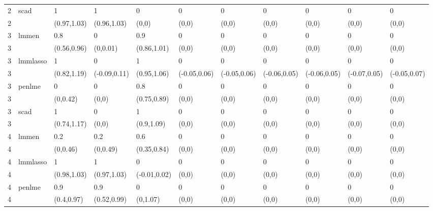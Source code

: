\documentclass[varwidth, border={10 5 10 5}]{standalone}
\begin{document}
\begin{table}[ht]
\begin{tabular}{lllllllllll}
  2 & \multirow{2}{*}{scad} & 1 & 1 & 0 & 0 & 0 & 0 & 0 & 0 & 0 \\ 
  2 &  & (0.97,1.03) & (0.96,1.03) & (0,0) & (0,0) & (0,0) & (0,0) & (0,0) & (0,0) & (0,0) \\ 
  3 & \multirow{2}{*}{lmmen} & 0.8 & 0 & 0.9 & 0 & 0 & 0 & 0 & 0 & 0 \\ 
  3 &  & (0.56,0.96) & (0,0.01) & (0.86,1.01) & (0,0) & (0,0) & (0,0) & (0,0) & (0,0) & (0,0) \\ 
  3 & \multirow{2}{*}{lmmlasso} & 1 & 0 & 1 & 0 & 0 & 0 & 0 & 0 & 0 \\ 
  3 &  & (0.82,1.19) & (-0.09,0.11) & (0.95,1.06) & (-0.05,0.06) & (-0.05,0.06) & (-0.06,0.05) & (-0.06,0.05) & (-0.07,0.05) & (-0.05,0.07) \\ 
  3 & \multirow{2}{*}{penlme} & 0 & 0 & 0.8 & 0 & 0 & 0 & 0 & 0 & 0 \\ 
  3 &  & (0,0.42) & (0,0) & (0.75,0.89) & (0,0) & (0,0) & (0,0) & (0,0) & (0,0) & (0,0) \\ 
  3 & \multirow{2}{*}{scad} & 1 & 0 & 1 & 0 & 0 & 0 & 0 & 0 & 0 \\ 
  3 &  & (0.74,1.17) & (0,0) & (0.9,1.09) & (0,0) & (0,0) & (0,0) & (0,0) & (0,0) & (0,0) \\ 
  4 & \multirow{2}{*}{lmmen} & 0.2 & 0.2 & 0.6 & 0 & 0 & 0 & 0 & 0 & 0 \\ 
  4 &  & (0,0.46) & (0,0.49) & (0.35,0.84) & (0,0) & (0,0) & (0,0) & (0,0) & (0,0) & (0,0) \\ 
  4 & \multirow{2}{*}{lmmlasso} & 1 & 1 & 0 & 0 & 0 & 0 & 0 & 0 & 0 \\ 
  4 &  & (0.98,1.03) & (0.97,1.03) & (-0.01,0.02) & (0,0) & (0,0) & (0,0) & (0,0) & (0,0) & (0,0) \\ 
  4 & \multirow{2}{*}{penlme} & 0.9 & 0.9 & 0 & 0 & 0 & 0 & 0 & 0 & 0 \\ 
  4 &  & (0.4,0.97) & (0.52,0.99) & (0,1.07) & (0,0) & (0,0) & (0,0) & (0,0) & (0,0) & (0,0) \\ 
   \hline
\end{tabular}
\end{table}
\end{document}
